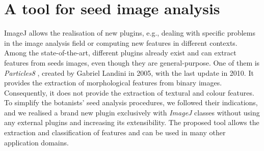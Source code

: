 \section{A tool for seed image analysis}
ImageJ allows the realisation of new plugins, e.g., dealing with specific problems in the image analysis field or computing new features in different contexts.
Among the state-of-the-art, different plugins already exist and can extract features from seeds images, even though they are general-purpose. One of them is \emph{Particles8} \cite{Landini}, created by Gabriel Landini in 2005, with the last update in 2010. It provides the extraction of morphological features from binary images. Consequently, it does not provide the extraction of textural and colour features.
To simplify the botanists' seed analysis procedures, we followed their indications, and we realised a brand new plugin exclusively with \emph{ImageJ} classes without using any external plugins and increasing its extensibility. The proposed tool allows the extraction and classification of features and can be used in many other application domains.

